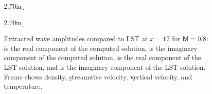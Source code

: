 \begin{figure}[p] \label{mheig:c}
\centering
\figlab 4.0in 2.70in {\c} 
\epsfxsize=4.5in
\end{figure}

\begin{figure}[p]
\centering
\figlab 4.0in 2.70in {\d} 
\epsfxsize=4.5in
\caption [Extracted wave amplitudes compared to LST at $x=12$ for
$\M=0.8$.]{Extracted wave amplitudes compared to LST at $x=12$ for $\M=0.8$:
\solid is the real component of the computed solution, \ldashed is the
imaginary component of the computed solution, \dashed is the real component of
the LST solution, and \dotted is the imaginary component of the LST
solution. Frame \a shows density, \b streamwise velocity, \c vertical
velocity, and \d temperature.
\label{mheig} }
\end{figure}
